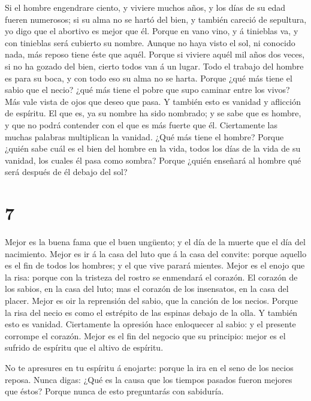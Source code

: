  Si el hombre engendrare ciento, y viviere muchos años, y
los días de su edad fueren numerosos; si su alma no se hartó del bien, y
también careció de sepultura, yo digo que el abortivo es mejor que él.
 Porque en vano vino, y á tinieblas va, y con tinieblas será
cubierto su nombre.  Aunque no haya visto el sol, ni
conocido nada, más reposo tiene éste que aquél.  Porque si
viviere aquél mil años dos veces, si no ha gozado del bien, cierto todos
van á un lugar.  Todo el trabajo del hombre es para su boca,
y con todo eso su alma no se harta.  Porque ¿qué más tiene
el sabio que el necio? ¿qué más tiene el pobre que supo caminar entre
los vivos?  Más vale vista de ojos que deseo que pasa. Y
también esto es vanidad y aflicción de espíritu.  El que
es, ya su nombre ha sido nombrado; y se sabe que es hombre, y que no
podrá contender con el que es más fuerte que él. 
Ciertamente las muchas palabras multiplican la vanidad. ¿Qué más tiene
el hombre?  Porque ¿quién sabe cuál es el bien del hombre
en la vida, todos los días de la vida de su vanidad, los cuales él pasa
como sombra? Porque ¿quién enseñará al hombre qué será después de él
debajo del sol?

\hypertarget{section-6}{%
\section{7}\label{section-6}}

 Mejor es la buena fama que el buen ungüento; y el día de la
muerte que el día del nacimiento.  Mejor es ir á la casa del
luto que á la casa del convite: porque aquello es el fin de todos los
hombres; y el que vive parará mientes.  Mejor es el enojo
que la risa: porque con la tristeza del rostro se enmendará el corazón.
 El corazón de los sabios, en la casa del luto; mas el
corazón de los insensatos, en la casa del placer.  Mejor es
oir la reprensión del sabio, que la canción de los necios. 
Porque la risa del necio es como el estrépito de las espinas debajo de
la olla. Y también esto es vanidad.  Ciertamente la opresión
hace enloquecer al sabio: y el presente corrompe el corazón.
 Mejor es el fin del negocio que su principio: mejor es el
sufrido de espíritu que el altivo de espíritu.

 No te apresures en tu espíritu á enojarte: porque la ira en
el seno de los necios reposa.  Nunca digas: ¿Qué es la
causa que los tiempos pasados fueron mejores que éstos? Porque nunca de
esto preguntarás con sabiduría.


